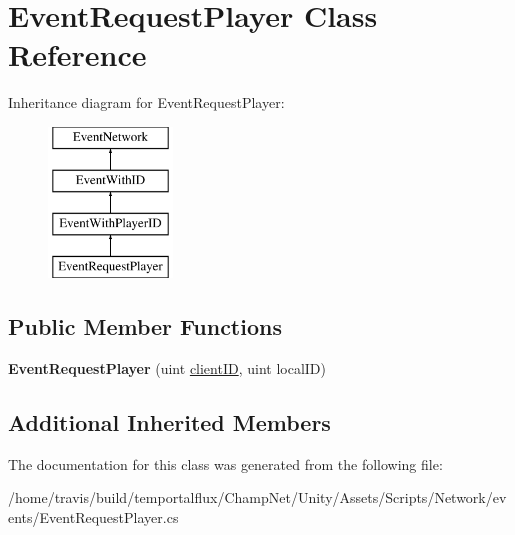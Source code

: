 \hypertarget{class_event_request_player}{\section{Event\-Request\-Player Class Reference}
\label{class_event_request_player}
}
Inheritance diagram for Event\-Request\-Player\-:\begin{figure}[H]
\begin{center}
\leavevmode
\includegraphics[height=4.000000cm]{class_event_request_player}
\end{center}
\end{figure}
\subsection*{Public Member Functions}
\begin{DoxyCompactItemize}
\item 
\hypertarget{class_event_request_player_a0c3ca4cc3a290ef17df5ff60a53c3f32}{{\bfseries Event\-Request\-Player} (uint \hyperlink{class_event_with_i_d_a4b58cdaef622cb06405b6829a160cef5}{client\-I\-D}, uint local\-I\-D)}\label{class_event_request_player_a0c3ca4cc3a290ef17df5ff60a53c3f32}

\end{DoxyCompactItemize}
\subsection*{Additional Inherited Members}


The documentation for this class was generated from the following file\-:\begin{DoxyCompactItemize}
\item 
/home/travis/build/temportalflux/\-Champ\-Net/\-Unity/\-Assets/\-Scripts/\-Network/events/Event\-Request\-Player.\-cs\end{DoxyCompactItemize}
